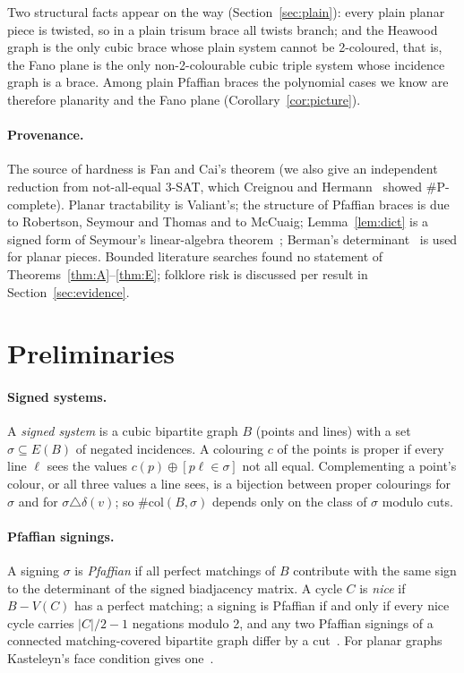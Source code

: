\documentclass[11pt]{article}
\theoremstyle{definition}
\theoremstyle{remark}
\newcommand{\sharpP}{\#\mathrm{P}}
\newcommand{\col}{\#\mathrm{col}}
\begin{document}
Two structural facts appear on the way (Section~\ref{sec:plain}): every plain
planar piece is twisted, so in a plain trisum brace all twists branch; and
the Heawood graph is the only cubic brace whose plain system cannot be
2-coloured, that is, the Fano plane is the only non-2-colourable cubic triple
system whose incidence graph is a brace. Among plain Pfaffian braces the
polynomial cases we know are therefore planarity and the Fano plane
(Corollary~\ref{cor:picture}).

\paragraph{Provenance.} The source of hardness is Fan and Cai's theorem (we
also give an independent reduction from not-all-equal 3-SAT, which
Creignou and Hermann~\cite{CH96} showed $\sharpP$-complete). Planar
tractability is Valiant's; the structure of Pfaffian braces is due to
Robertson, Seymour and Thomas and to McCuaig; Lemma~\ref{lem:dict} is a
signed form of Seymour's linear-algebra theorem~\cite{Sey74}; Berman's
determinant~\cite{Ber80} is used for planar pieces. Bounded literature
searches found no statement of Theorems~\ref{thm:A}--\ref{thm:E}; folklore
risk is discussed per result in Section~\ref{sec:evidence}.

\section{Preliminaries}\label{sec:prelim}

\paragraph{Signed systems.} A \emph{signed system} is a cubic bipartite graph
$B$ (points and lines) with a set $\sigma\subseteq E(B)$ of negated
incidences. A colouring $c$ of the points is proper if every line $\ell$ sees
the values $c(p)\oplus[p\ell\in\sigma]$ not all equal. Complementing a point's
colour, or all three values a line sees, is a bijection between proper
colourings for $\sigma$ and for $\sigma\triangle\delta(v)$; so $\col(B,\sigma)$
depends only on the class of $\sigma$ modulo cuts.

\paragraph{Pfaffian signings.} A signing $\sigma$ is \emph{Pfaffian} if all
perfect matchings of $B$ contribute with the same sign to the determinant of
the signed biadjacency matrix. A cycle $C$ is \emph{nice} if $B-V(C)$ has a
perfect matching; a signing is Pfaffian if and only if every nice cycle
carries $|C|/2-1$ negations modulo 2, and any two Pfaffian signings of a
connected matching-covered bipartite graph differ by a cut~\cite{Lit75,LP86}.
For planar graphs Kasteleyn's face condition gives one~\cite{Kas63}.
\end{document}
